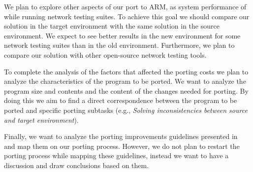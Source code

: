 We plan to explore other aspects of our port to ARM, as system performance of
while running network testing suites.  To achieve this goal we should compare
our solution in the target environment with the same solution in the source
environment. We expect to see better results in the new environment for some
network testing suites than in the old environment. Furthermore, we plan to
compare our solution with other open-source network testing tools.

To complete the analysis of the factors that affected the porting costs we plan
to analyze the characteristics of the program to be ported. We want to analyze
the program size and contents and the content of the changes needed for porting.
By doing this we aim to find a direct correspondence between the program to be
ported and specific porting subtasks (e.g., \textit{Solving inconsistencies
between source and target environment}).

Finally, we want to analyze the porting improvements guidelines presented
in~\cite{hakuta} and map them on our porting process. However, we do not plan to
restart the porting process while mapping these guidelines, instead we want to
have a discussion and draw conclusions based on them.

